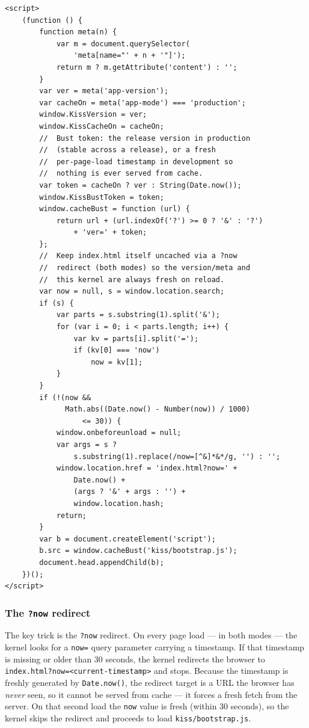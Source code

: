 \begin{lstlisting}[style=html]
<script>
    (function () {
        function meta(n) {
            var m = document.querySelector(
                'meta[name="' + n + '"]');
            return m ? m.getAttribute('content') : '';
        }
        var ver = meta('app-version');
        var cacheOn = meta('app-mode') === 'production';
        window.KissVersion = ver;
        window.KissCacheOn = cacheOn;
        //  Bust token: the release version in production
        //  (stable across a release), or a fresh
        //  per-page-load timestamp in development so
        //  nothing is ever served from cache.
        var token = cacheOn ? ver : String(Date.now());
        window.KissBustToken = token;
        window.cacheBust = function (url) {
            return url + (url.indexOf('?') >= 0 ? '&' : '?')
                + 'ver=' + token;
        };
        //  Keep index.html itself uncached via a ?now
        //  redirect (both modes) so the version/meta and
        //  this kernel are always fresh on reload.
        var now = null, s = window.location.search;
        if (s) {
            var parts = s.substring(1).split('&');
            for (var i = 0; i < parts.length; i++) {
                var kv = parts[i].split('=');
                if (kv[0] === 'now')
                    now = kv[1];
            }
        }
        if (!(now &&
              Math.abs((Date.now() - Number(now)) / 1000)
                  <= 30)) {
            window.onbeforeunload = null;
            var args = s ?
                s.substring(1).replace(/now=[^&]*&*/g, '') : '';
            window.location.href = 'index.html?now=' +
                Date.now() +
                (args ? '&' + args : '') +
                window.location.hash;
            return;
        }
        var b = document.createElement('script');
        b.src = window.cacheBust('kiss/bootstrap.js');
        document.head.appendChild(b);
    })();
</script>
\end{lstlisting}

\subsubsection*{The \texttt{?now} redirect}

The key trick is the \texttt{?now} redirect.  On every page load --- in both modes --- the kernel looks for a \texttt{now=} query parameter carrying a timestamp.  If that timestamp is missing or older than 30 seconds, the kernel redirects the browser to \texttt{index.html?now=<current-timestamp>} and stops.  Because the timestamp is freshly generated by \texttt{Date.now()}, the redirect target is a URL the browser has \emph{never} seen, so it cannot be served from cache --- it forces a fresh fetch from the server.  On that second load the \texttt{now} value is fresh (within 30 seconds), so the kernel skips the redirect and proceeds to load \texttt{kiss/bootstrap.js}.

